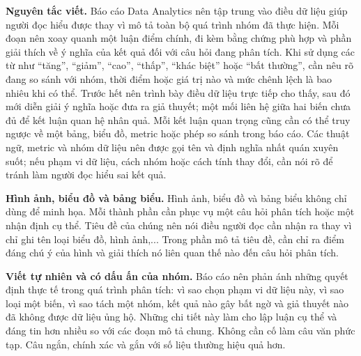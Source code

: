 \documentclass[12pt]{eDA_conquer2026}
\begin{document}
\textbf{Nguyên tắc viết.}
Báo cáo Data Analytics nên tập trung vào điều dữ liệu giúp người đọc hiểu được thay vì mô tả toàn bộ quá trình nhóm đã thực hiện. Mỗi đoạn nên xoay quanh một luận điểm chính, đi kèm bằng chứng phù hợp và phần giải thích về ý nghĩa của kết quả đối với câu hỏi đang phân tích. Khi sử dụng các từ như ``tăng'', ``giảm'', ``cao'', ``thấp'', ``khác biệt'' hoặc ``bất thường'', cần nêu rõ đang so sánh với nhóm, thời điểm hoặc giá trị nào và mức chênh lệch là bao nhiêu khi có thể. Trước hết nên trình bày điều dữ liệu trực tiếp cho thấy, sau đó mới diễn giải ý nghĩa hoặc đưa ra giả thuyết; một mối liên hệ giữa hai biến chưa đủ để kết luận quan hệ nhân quả. Mỗi kết luận quan trọng cũng cần có thể truy ngược về một bảng, biểu đồ, metric hoặc phép so sánh trong báo cáo. Các thuật ngữ, metric và nhóm dữ liệu nên được gọi tên và định nghĩa nhất quán xuyên suốt; nếu phạm vi dữ liệu, cách nhóm hoặc cách tính thay đổi, cần nói rõ để tránh làm người đọc hiểu sai kết quả.

\textbf{Hình ảnh, biểu đồ và bảng biểu.}
Hình ảnh, biểu đồ và bảng biểu không chỉ dùng để minh họa. Mỗi thành phần cần phục vụ một câu hỏi phân tích hoặc một nhận định cụ thể. Tiêu đề của chúng nên nói điều người đọc cần nhận ra thay vì chỉ ghi tên loại biểu đồ, hình ảnh,... Trong phần mô tả tiêu đề, cần chỉ ra điểm đáng chú ý của hình và giải thích nó liên quan thế nào đến câu hỏi phân tích.

\textbf{Viết tự nhiên và có dấu ấn của nhóm.}
Báo cáo nên phản ánh những quyết định thực tế trong quá trình phân tích: vì sao chọn phạm vi dữ liệu này, vì sao loại một biến, vì sao tách một nhóm, kết quả nào gây bất ngờ và giả thuyết nào đã không được dữ liệu ủng hộ. Những chi tiết này làm cho lập luận cụ thể và đáng tin hơn nhiều so với các đoạn mô tả chung. Không cần cố làm câu văn phức tạp. Câu ngắn, chính xác và gắn với số liệu thường hiệu quả hơn.
\end{document}
